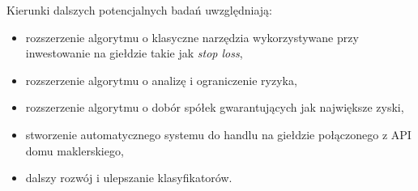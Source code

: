 \documentclass[a4paper, twoside, 11pt, openright]{article}
\begin{document}
\bigskip

Kierunki dalszych potencjalnych badań uwzględniają:
\begin{itemize}
	\item rozszerzenie algorytmu o klasyczne narzędzia wykorzystywane przy inwestowanie na giełdzie takie jak \textit{stop loss},
	\item rozszerzenie algorytmu o analizę i ograniczenie ryzyka,
	\item rozszerzenie algorytmu o dobór spółek gwarantujących jak największe zyski,
	\item stworzenie automatycznego systemu do handlu na giełdzie połączonego z API domu maklerskiego,
	\item dalszy rozwój i ulepszanie klasyfikatorów.
\end{itemize}


\newpage
\end{document}
